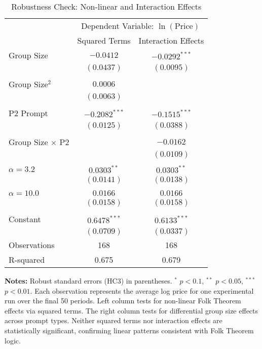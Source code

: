 \begin{table}[H]
    \centering
    \caption{Robustness Check: Non-linear and Interaction Effects}
    \label{tab:robustness_nonlinear}
    \begin{threeparttable}
    \begin{tabular}{lcc}
    \toprule
     & \multicolumn{2}{c}{Dependent Variable: $\ln(\text{Price})$} \\
    \cmidrule(lr){2-3}
     & Squared Terms & Interaction Effects \\
    \midrule
    Group Size & $-0.0412$ & $-0.0292^{***}$ \\
     & $(0.0437)$ & $(0.0095)$ \\
    \\
    Group Size$^2$ & $0.0006$ &  \\
     & $(0.0063)$ &  \\
    \\
    P2 Prompt & $-0.2082^{***}$ & $-0.1515^{***}$ \\
     & $(0.0125)$ & $(0.0388)$ \\
    \\
    Group Size $\times$ P2 &  & $-0.0162$ \\
     &  & $(0.0109)$ \\
    \\
    $\alpha = 3.2$ & $0.0303^{**}$ & $0.0303^{**}$ \\
     & $(0.0141)$ & $(0.0138)$ \\
    \\
    $\alpha = 10.0$ & $0.0166$ & $0.0166$ \\
     & $(0.0158)$ & $(0.0158)$ \\
    \\
    Constant & $0.6478^{***}$ & $0.6133^{***}$ \\
     & $(0.0709)$ & $(0.0337)$ \\
    \midrule
    Observations & 168 & 168 \\
    R-squared & 0.675 & 0.679 \\
    \bottomrule
    \end{tabular}
    \begin{tablenotes}[flushleft]
    \footnotesize
    \item \textbf{Notes:} Robust standard errors (HC3) in parentheses. $^{*}$ $p<0.1$, $^{**}$ $p<0.05$, $^{***}$ $p<0.01$. Each observation represents the average log price for one experimental run over the final 50 periods. Left column tests for non-linear Folk Theorem effects via squared terms. The right column tests for differential group size effects across prompt types. Neither squared terms nor interaction effects are statistically significant, confirming linear patterns consistent with Folk Theorem logic.
    \end{tablenotes}
    \end{threeparttable}
\end{table}

